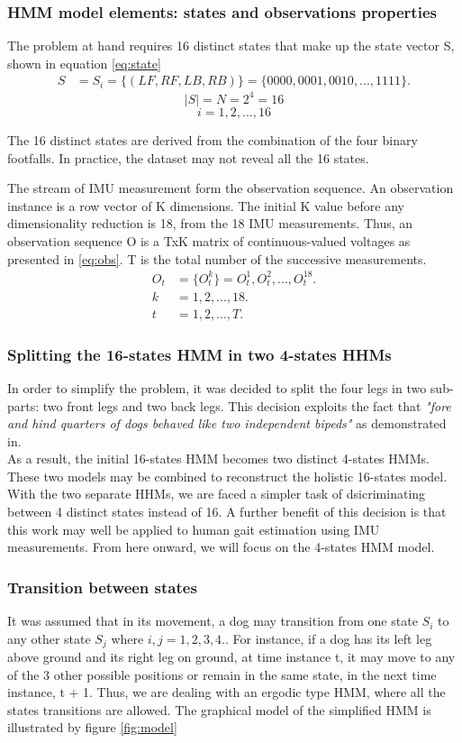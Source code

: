 \subsubsection{HMM model elements: states and observations properties}
The problem at hand requires 16 distinct states that make up the state vector S, shown in equation \ref{eq:state}
\begin{align} \label{eq:state}
S &= {S_i} = \{(LF, RF, LB, RB)\} = \{0000, 0001, 0010, ..., 1111\}.
\end{align}
\[|S| = N = 2^4 = 16\]
\[i = 1, 2, ..., 16\]

The 16 distinct states are derived from the combination of the four binary footfalls. In practice, the dataset may not reveal all the 16 states.

The stream of IMU measurement form the observation sequence. An observation instance is a row vector of K dimensions. The initial K value before any dimensionality reduction is 18, from the 18 IMU measurements.
Thus, an observation sequence O is a TxK matrix of continuous-valued voltages as presented in \ref{eq:obs}. T is the total number of the successive measurements.
\begin{align} \label{eq:obs}
O_t &= \{O^k_t\} = O^1_t, O^2_t, ..., O^18_t. \\
k &= 1, 2, ..., 18. \\
t &= 1, 2, ..., T.
\end{align}


\subsubsection{Splitting the 16-states HMM in two 4-states HHMs}
In order to simplify the problem, it was decided to split the four legs in two sub-parts: two front legs and two back legs. This decision exploits the fact that \textit{"fore and hind quarters of dogs behaved like two independent bipeds"} as demonstrated in.\\%
As a result, the initial 16-states HMM becomes two distinct 4-states HMMs. These two models may be combined to reconstruct the holistic 16-states model. 
With the two separate HHMs, we are faced a simpler task of dsicriminating between 4 distinct states instead of 16. A further benefit of this decision is that this work may well be applied to human gait estimation using IMU measurements. From here onward, we will focus on the 4-states HMM model.
 
\subsubsection{Transition between states}
It was assumed that in its movement, a dog may transition from one state \(S_i\) to any other state \(S_j\) where \(i, j = 1, 2, 3, 4.\).
For instance, if a dog has its left leg above ground and its right leg on ground, at time instance t, it may move to any of the 3 other possible positions or remain in the same state, in the next time instance, t + 1. 
Thus, we are dealing with an ergodic type HMM, where all the states transitions are allowed. The graphical model of the simplified HMM is illustrated by figure \ref{fig:model}

